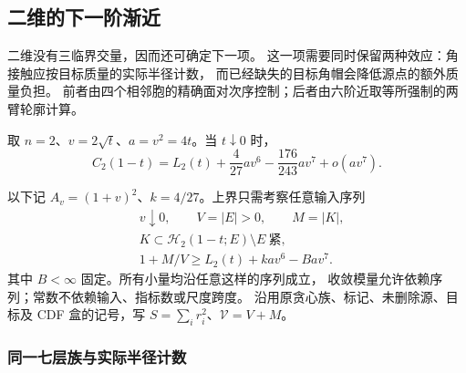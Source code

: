 \subsection{二维的下一阶渐近}
\label{planar:section}

二维没有三临界交量，因而还可确定下一项。
这一项需要同时保留两种效应：角接触应按目标质量的实际半径计数，
而已经缺失的目标角帽会降低源点的额外质量负担。
前者由四个相邻胞的精确面对次序控制；后者由六阶近取等所强制的两臂轮廓计算。

\begin{theorem}[二维七阶渐近]\label{planar:seventh}
取 \(n=2\)、\(v=2\sqrt t\)、\(a=v^2=4t\)。当 \(t\downarrow0\) 时，
\begin{equation}\label{planar:asymptotic}
 C_2(1-t)=L_2(t)+\frac4{27}av^6-\frac{176}{243}av^7+o(av^7).
\end{equation}
\end{theorem}

以下记 \(A_v=(1+v)^2\)、\(k=4/27\)。上界只需考察任意输入序列
\begin{equation}\label{planar:critical}
 \begin{aligned}
 &v\downarrow0,\qquad V=|E|>0,\qquad M=|K|,\\
 &K\subset\mathcal H_2(1-t;E)\setminus E\ \text{紧},\\
 &1+M/V\ge L_2(t)+kav^6-Bav^7.
 \end{aligned}
\end{equation}
其中 \(B<\infty\) 固定。所有小量均沿任意这样的序列成立，
收敛模量允许依赖序列；常数不依赖输入、指标数或尺度跨度。
沿用原贪心族、标记、未删除源、目标及 CDF 盒的记号，写
\(S=\sum_i r_i^2\)、\(\mathcal V=V+M\)。

\subsubsection{同一七层族与实际半径计数}

